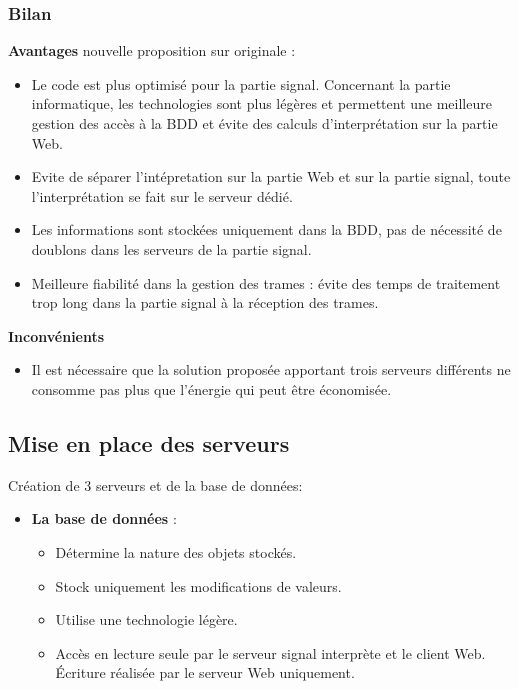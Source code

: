 \documentclass[10pt,a4paper]{article}
\begin{document}
\subsubsection{Bilan}
\textbf{Avantages} nouvelle proposition sur originale :
\begin{itemize}
  \item Le code est plus optimisé pour la partie signal. Concernant la partie informatique, les technologies sont plus légères et permettent une meilleure gestion des accès à la BDD et évite des calculs d'interprétation sur la partie Web.
  \item Evite de séparer l'intépretation sur la partie Web et sur la partie signal, toute l'interprétation se fait sur le serveur dédié.
  \item Les informations sont stockées uniquement dans la BDD, pas de nécessité de doublons dans les serveurs de la partie signal.
  \item Meilleure fiabilité dans la gestion des trames : évite des temps de traitement trop long dans la partie signal à la réception des trames.
\end{itemize}
\textbf{Inconvénients}
\begin{itemize}
  \item Il est nécessaire que la solution proposée apportant trois serveurs différents ne consomme pas plus que l'énergie qui peut être économisée.
\end{itemize}

\subsection{Mise en place des serveurs}

Création de 3 serveurs et de la base de données:

\begin{itemize}
  \item \textbf{La base de données} :
  \begin{itemize}
    \item Détermine la nature des objets stockés.
    \item Stock uniquement les modifications de valeurs.
    \item Utilise une technologie légère.
    \item Accès en lecture seule par le serveur signal interprète et le client Web. Écriture réalisée par le serveur Web uniquement.
  \end{itemize}
\end{itemize}
\end{document}
